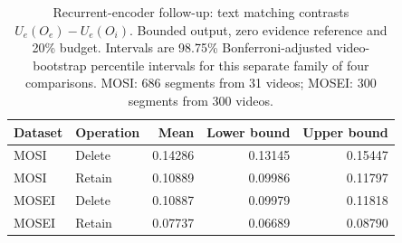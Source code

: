 \begin{table}[!htbp]
\centering\small
\caption{Recurrent-encoder follow-up: text matching contrasts $U_e(O_e)-U_e(O_i)$. Bounded output, zero evidence reference and 20\% budget. Intervals are 98.75\% Bonferroni-adjusted video-bootstrap percentile intervals for this separate family of four comparisons. MOSI: 686 segments from 31 videos; MOSEI: 300 segments from 300 videos.}
\label{tab:recurrent-primary}
\begin{tabular}{llrrr}
\toprule
Dataset & Operation & Mean & Lower bound & Upper bound \\
\midrule
MOSI & Delete & 0.14286 & 0.13145 & 0.15447 \\
MOSI & Retain & 0.10889 & 0.09986 & 0.11797 \\
MOSEI & Delete & 0.10887 & 0.09979 & 0.11818 \\
MOSEI & Retain & 0.07737 & 0.06689 & 0.08790 \\
\bottomrule
\end{tabular}
\end{table}
